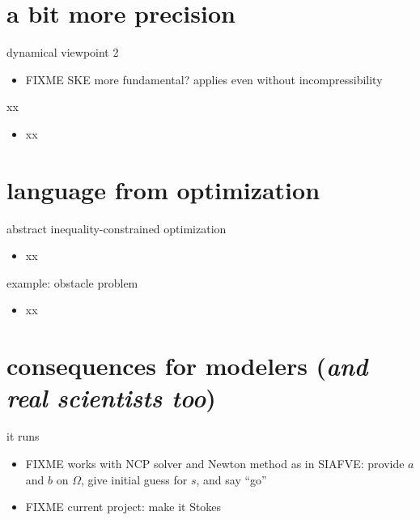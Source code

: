 \documentclass[10pt,hyperref,dvipsnames]{beamer}
\begin{document}
\section{a bit more precision}

\begin{frame}{dynamical viewpoint 2}
\begin{itemize}
\item FIXME SKE more fundamental? applies even without incompressibility
\end{itemize}
\end{frame}


\begin{frame}{xx}
\begin{itemize}
\item xx
\end{itemize}
\end{frame}


\section{language from optimization}

\begin{frame}{abstract inequality-constrained optimization}
\begin{itemize}
\item xx
\end{itemize}
\end{frame}

\begin{frame}{example: obstacle problem}
\begin{itemize}
\item xx
\end{itemize}
\end{frame}


\section{consequences for modelers (\emph{and real scientists too})}

\begin{frame}{it runs}
\begin{itemize}
\item FIXME works with NCP solver and Newton method as in SIAFVE: provide $a$ and $b$ on $\Omega$, give initial guess for $s$, and say ``go''
\item FIXME current project: make it Stokes
\end{itemize}
\end{frame}
\end{document}
